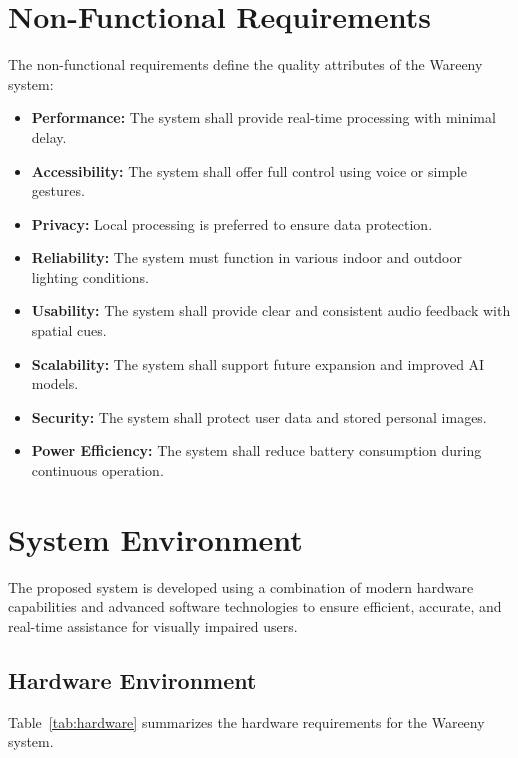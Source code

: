 \documentclass[a4paper]{report}
\begin{document}
\section{Non-Functional Requirements}

The non-functional requirements define the quality attributes of the Wareeny system:

\begin{itemize}
  \item \textbf{Performance:} The system shall provide real-time processing with minimal delay.
  \item \textbf{Accessibility:} The system shall offer full control using voice or simple gestures.
  \item \textbf{Privacy:} Local processing is preferred to ensure data protection.
  \item \textbf{Reliability:} The system must function in various indoor and outdoor lighting conditions.
  \item \textbf{Usability:} The system shall provide clear and consistent audio feedback with spatial cues.
  \item \textbf{Scalability:} The system shall support future expansion and improved AI models.
  \item \textbf{Security:} The system shall protect user data and stored personal images.
  \item \textbf{Power Efficiency:} The system shall reduce battery consumption during continuous operation.
\end{itemize}

\section{System Environment}

The proposed system is developed using a combination of modern hardware capabilities and advanced software technologies to ensure efficient, accurate, and real-time assistance for visually impaired users.

\subsection{Hardware Environment}

Table~\ref{tab:hardware} summarizes the hardware requirements for the Wareeny system.
\end{document}

